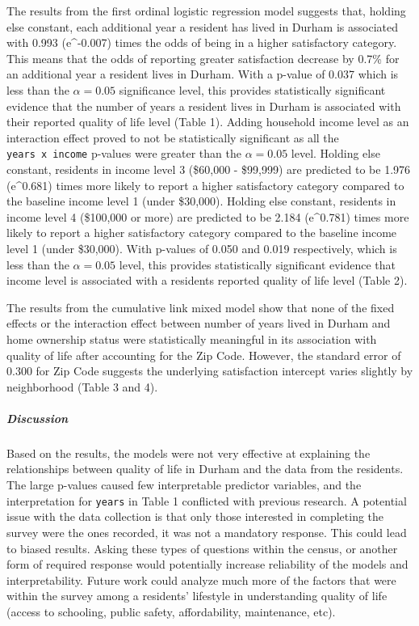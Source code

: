 \documentclass[
  4pt,
]{article}
\begin{document}
The results from the first ordinal logistic regression model suggests
that, holding else constant, each additional year a resident has lived
in Durham is associated with 0.993 (e\^{}-0.007) times the odds of being
in a higher satisfactory category. This means that the odds of reporting
greater satisfaction decrease by 0.7\% for an additional year a resident
lives in Durham. With a p-value of 0.037 which is less than the
\(\alpha = 0.05\) significance level, this provides statistically
significant evidence that the number of years a resident lives in Durham
is associated with their reported quality of life level (Table 1).
Adding household income level as an interaction effect proved to not be
statistically significant as all the \texttt{years\ x\ income} p-values
were greater than the \(\alpha = 0.05\) level. Holding else constant,
residents in income level 3 (\$60,000 - \$99,999) are predicted to be
1.976 (e\^{}0.681) times more likely to report a higher satisfactory
category compared to the baseline income level 1 (under \$30,000).
Holding else constant, residents in income level 4 (\$100,000 or more)
are predicted to be 2.184 (e\^{}0.781) times more likely to report a
higher satisfactory category compared to the baseline income level 1
(under \$30,000). With p-values of 0.050 and 0.019 respectively, which
is less than the \(\alpha = 0.05\) level, this provides statistically
significant evidence that income level is associated with a residents
reported quality of life level (Table 2).

The results from the cumulative link mixed model show that none of the
fixed effects or the interaction effect between number of years lived in
Durham and home ownership status were statistically meaningful in its
association with quality of life after accounting for the Zip Code.
However, the standard error of 0.300 for Zip Code suggests the
underlying satisfaction intercept varies slightly by neighborhood (Table
3 and 4).

\subparagraph{Discussion}\label{discussion}

Based on the results, the models were not very effective at explaining
the relationships between quality of life in Durham and the data from
the residents. The large p-values caused few interpretable predictor
variables, and the interpretation for \texttt{years} in Table 1
conflicted with previous research. A potential issue with the data
collection is that only those interested in completing the survey were
the ones recorded, it was not a mandatory response. This could lead to
biased results. Asking these types of questions within the census, or
another form of required response would potentially increase reliability
of the models and interpretability. Future work could analyze much more
of the factors that were within the survey among a residents' lifestyle
in understanding quality of life (access to schooling, public safety,
affordability, maintenance, etc).
\end{document}
